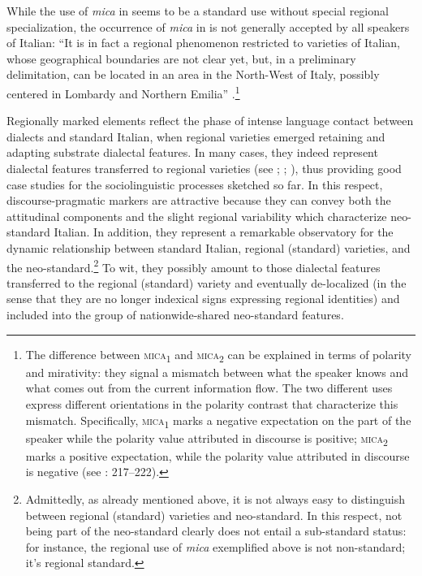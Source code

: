 While the use of \textit{mica} in  seems to be a standard use without special regional specialization, the occurrence of \textit{mica} in  is not generally accepted by all speakers of Italian: “It is in fact a regional phenomenon restricted to varieties of Italian, whose geographical boundaries are not clear yet, but, in a preliminary delimitation, can be located in an area in the North-West of Italy, possibly centered in Lombardy and Northern Emilia” \citep[215]{Squartini2017}.\footnote{The difference between \textsc{mica}\textsubscript{1}  and \textsc{mica}\textsubscript{2}  can be explained in terms of polarity and mirativity: they signal a mismatch between what the speaker knows and what comes out from the current information flow. The two different uses express different orientations in the polarity contrast that characterize this mismatch. Specifically, \textsc{mica}\textsubscript{1} marks a negative expectation on the part of the speaker while the polarity value attributed in discourse is positive; \textsc{mica}\textsubscript{2} marks a positive expectation, while the polarity value attributed in discourse is negative (see \citealt{Squartini2017}: 217–222).}

Regionally marked elements reflect the phase of intense language contact between dialects and standard Italian, when regional varieties emerged retaining and adapting substrate dialectal features. In many cases, they indeed represent dialectal features transferred to regional varieties (see \citealt{Calaresu2015}; \citealt{FavaroGoria2019}; \citealt{Cerruti2020}), thus providing good case studies for the sociolinguistic processes sketched so far. In this respect, discourse-pragmatic markers are attractive because they can convey both the attitudinal components and the slight regional variability which characterize neo-standard Italian. In addition, they represent a remarkable observatory for the dynamic relationship between standard Italian, regional (standard) varieties, and the neo-standard.\footnote{Admittedly, as already mentioned above, it is not always easy to distinguish between regional (standard) varieties and neo-standard. In this respect, not being part of the neo-standard clearly does not entail a sub-standard status: for instance, the regional use of \textit{mica} exemplified above is not non-standard; it’s regional standard.} To wit, they possibly amount to those dialectal features transferred to the regional (standard) variety and eventually de-localized (in the sense that they are no longer indexical signs expressing regional identities) and included into the group of nationwide-shared neo-standard features.

